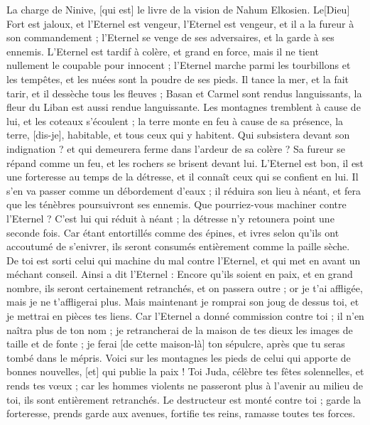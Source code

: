 \BFont
\begin{multicols}{2}
\VerseOne{}La charge de Ninive, [qui est] le livre de la vision de Nahum Elkosien.
Le[Dieu] Fort est jaloux, et l'Eternel est vengeur, l'Eternel est vengeur, et il a la fureur à son commandement ; l'Eternel se venge de ses adversaires, et la garde à ses ennemis.
L'Eternel est tardif à colère, et grand en force, mais il ne tient nullement le coupable pour innocent ; l'Eternel marche parmi les tourbillons et les tempêtes, et les nuées sont la poudre de ses pieds.
Il tance la mer, et la fait tarir, et il dessèche tous les fleuves ; Basan et Carmel sont rendus languissants, la fleur du Liban est aussi rendue languissante.
Les montagnes tremblent à cause de lui, et les coteaux s'écoulent ; la terre monte en feu à cause de sa présence, la terre, [dis-je], habitable, et tous ceux qui y habitent.
Qui subsistera devant son indignation ? et qui demeurera ferme dans l'ardeur de sa colère ? Sa fureur se répand comme un feu, et les rochers se brisent devant lui.
L'Eternel est bon, il est une forteresse au temps de la détresse, et il connaît ceux qui se confient en lui.
Il s'en va passer comme un débordement d'eaux ; il réduira son lieu à néant, et fera que les ténèbres poursuivront ses ennemis.
Que pourriez-vous machiner contre l'Eternel ? C'est lui qui réduit à néant ; la détresse n'y retounera point une seconde fois.
Car étant entortillés comme des épines, et ivres selon qu'ils ont accoutumé de s'enivrer, ils seront consumés entièrement comme la paille sèche.
De toi est sorti celui qui machine du mal contre l'Eternel, et qui met en avant un méchant conseil.
Ainsi a dit l'Eternel : Encore qu'ils soient en paix, et en grand nombre, ils seront certainement retranchés, et on passera outre ; or je t'ai affligée, mais je ne t'affligerai plus.
Mais maintenant je romprai son joug de dessus toi, et je mettrai en pièces tes liens.
Car l'Eternel a donné commission contre toi ; il n'en naîtra plus de ton nom ; je retrancherai de la maison de tes dieux les images de taille et de fonte ; je ferai [de cette maison-là] ton sépulcre, après que tu seras tombé dans le mépris.
Voici sur les montagnes les pieds de celui qui apporte de bonnes nouvelles, [et] qui publie la paix ! Toi Juda, célèbre tes fêtes solennelles, et rends tes vœux ; car les hommes violents ne passeront plus à l'avenir au milieu de toi, ils sont entièrement retranchés.
\VerseOne{}Le destructeur est monté contre toi ; garde la forteresse, prends garde aux avenues, fortifie tes reins, ramasse toutes tes forces.

\end{multicols}
